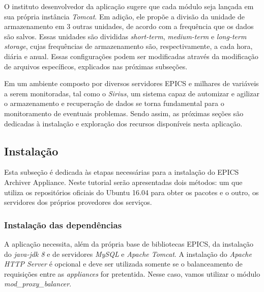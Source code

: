 \FloatBarrier

O instituto desenvolvedor da aplicação sugere que cada módulo seja lançada em
sua própria instância \textit{Tomcat}. Em adição, ele propõe a divisão da
unidade de armazenamento em 3 outras unidades, de acordo com a frequência que os
dados são salvos. Essas unidades são divididas \textit{short-term},
\textit{medium-term} e \textit{long-term storage}, cujas frequências de
armazenamento são, respectivamente, a cada hora, diária e anual. Essas
configurações podem ser modificadas através da modificação de arquivos
específicos, explicados nas próximas subseções.

\vspace{12pt}


Em um ambiente composto por diversos servidores EPICS e milhares de variáveis a
serem monitoradas, tal como o \textit{Sirius}, um sistema capaz de automizar e
agilizar o armazenamento e recuperação de dados se torna fundamental para o
monitoramento de eventuais problemas. Sendo assim, as próximas seções são
dedicadas à instalação e exploração dos recursos disponíveis nesta aplicação.
\subsection {Instalação}

Esta subseção é dedicada às etapas necessárias para a instalação do EPICS
Archiver Appliance. Neste tutorial serão apresentadas dois métodos: um que
utiliza os repositórios oficiais do Ubuntu 16.04 para obter os pacotes e o
outro, os servidores dos próprios provedores dos serviços.

\subsubsection {Instalação das dependências}
\label{ref:epics-install}
A aplicação necessita, além da própria base de bibliotecas EPICS, da
instalação do \textit{java-jdk 8} e de servidores \textit{MySQL} e
\textit{Apache Tomcat}. A instalação do \textit{Apache HTTP Server} é opcional e
deve ser utilizada somente se o balanceamento de requisições entre as
\textit{appliances} for pretentida. Nesse caso, vamos utilizar o módulo
\textit{mod\_proxy\_balancer}.

